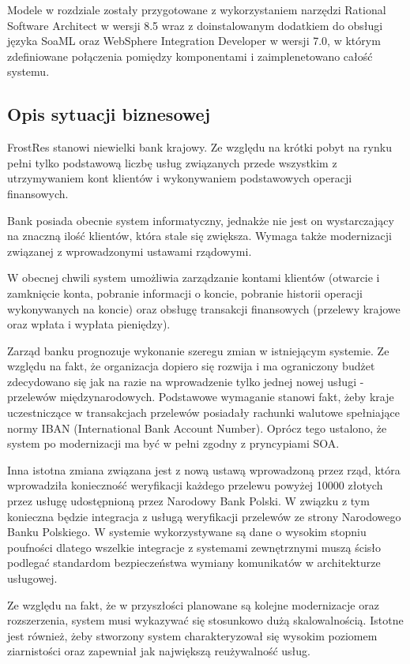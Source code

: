 Modele w rozdziale zostały przygotowane z wykorzystaniem narzędzi Rational Software Architect w wersji 8.5 wraz z doinstalowanym dodatkiem do obsługi języka SoaML oraz WebSphere Integration Developer w wersji 7.0, w którym zdefiniowane połączenia pomiędzy komponentami i zaimplenetowano całość systemu.

\subsection{Opis sytuacji biznesowej}
FrostRes stanowi niewielki bank krajowy. Ze względu na krótki pobyt na rynku pełni tylko podstawową liczbę usług związanych przede wszystkim z utrzymywaniem kont klientów i wykonywaniem podstawowych operacji finansowych. 
 
Bank posiada obecnie system informatyczny, jednakże nie jest on wystarczający na znaczną ilość klientów, która stale się zwiększa. Wymaga także modernizacji związanej z wprowadzonymi ustawami rządowymi.  

W obecnej chwili system umożliwia zarządzanie kontami klientów (otwarcie i zamknięcie konta, pobranie informacji o koncie, pobranie historii operacji wykonywanych na koncie) oraz obsługę transakcji finansowych (przelewy krajowe oraz wpłata i wypłata pieniędzy). 

Zarząd banku prognozuje wykonanie szeregu zmian w istniejącym systemie. Ze względu na fakt, że organizacja dopiero się rozwija i ma ograniczony budżet zdecydowano się jak na razie na wprowadzenie tylko jednej nowej usługi - przelewów międzynarodowych. Podstawowe wymaganie stanowi fakt, żeby kraje uczestniczące w transakcjach przelewów posiadały rachunki walutowe spełniające normy IBAN (International Bank Account Number). Oprócz tego ustalono, że system po modernizacji ma być w pełni zgodny z pryncypiami SOA. 

Inna istotna zmiana związana jest z nową ustawą wprowadzoną przez rząd, która wprowadziła konieczność weryfikacji każdego przelewu powyżej 10000 złotych przez usługę udostępnioną przez Narodowy Bank Polski. W związku z tym konieczna będzie integracja z usługą weryfikacji przelewów ze strony Narodowego Banku Polskiego. W systemie wykorzystywane są dane o wysokim stopniu poufności dlatego wszelkie integracje z systemami zewnętrznymi muszą ścisło podlegać standardom bezpieczeństwa wymiany komunikatów w architekturze usługowej.

Ze względu na fakt, że w przyszłości planowane są kolejne modernizacje oraz rozszerzenia, system musi wykazywać się stosunkowo dużą skalowalnością. Istotne jest również, żeby stworzony system charakteryzował się wysokim poziomem ziarnistości oraz zapewniał jak największą reużywalność usług. 


